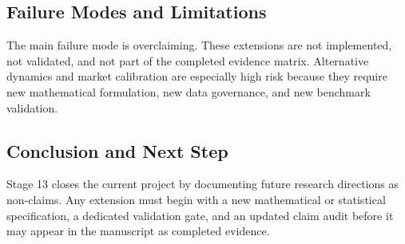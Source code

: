\documentclass[11pt]{article}
\begin{document}


\subsection{Failure Modes and Limitations}
The main failure mode is overclaiming. These extensions are not implemented, not validated, and not part of the completed evidence matrix. Alternative dynamics and market calibration are especially high risk because they require new mathematical formulation, new data governance, and new benchmark validation.

\subsection{Conclusion and Next Step}
Stage 13 closes the current project by documenting future research directions
as non-claims. Any extension must begin with a new mathematical or statistical
specification, a dedicated validation gate, and an updated claim audit before
it may appear in the manuscript as completed evidence.
\end{document}
